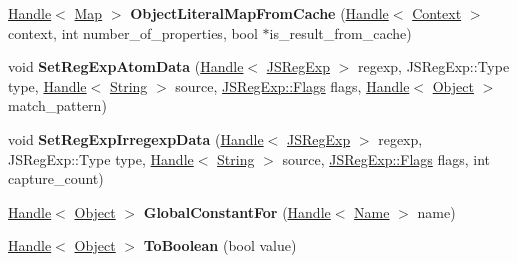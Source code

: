 \begin{DoxyCompactItemize}
\item 
\hyperlink{classv8_1_1internal_1_1_handle}{Handle}$<$ \hyperlink{classv8_1_1internal_1_1_map}{Map} $>$ {\bfseries Object\+Literal\+Map\+From\+Cache} (\hyperlink{classv8_1_1internal_1_1_handle}{Handle}$<$ \hyperlink{classv8_1_1internal_1_1_context}{Context} $>$ context, int number\+\_\+of\+\_\+properties, bool $\ast$is\+\_\+result\+\_\+from\+\_\+cache)\hypertarget{classv8_1_1internal_1_1_factory_ac680fa850230a4a608e92e330f265ba0}{}\label{classv8_1_1internal_1_1_factory_ac680fa850230a4a608e92e330f265ba0}

\item 
void {\bfseries Set\+Reg\+Exp\+Atom\+Data} (\hyperlink{classv8_1_1internal_1_1_handle}{Handle}$<$ \hyperlink{classv8_1_1internal_1_1_j_s_reg_exp}{J\+S\+Reg\+Exp} $>$ regexp, J\+S\+Reg\+Exp\+::\+Type type, \hyperlink{classv8_1_1internal_1_1_handle}{Handle}$<$ \hyperlink{classv8_1_1internal_1_1_string}{String} $>$ source, \hyperlink{classv8_1_1base_1_1_flags}{J\+S\+Reg\+Exp\+::\+Flags} flags, \hyperlink{classv8_1_1internal_1_1_handle}{Handle}$<$ \hyperlink{classv8_1_1internal_1_1_object}{Object} $>$ match\+\_\+pattern)\hypertarget{classv8_1_1internal_1_1_factory_aca744f4071916ff928536c07f8fa29f4}{}\label{classv8_1_1internal_1_1_factory_aca744f4071916ff928536c07f8fa29f4}

\item 
void {\bfseries Set\+Reg\+Exp\+Irregexp\+Data} (\hyperlink{classv8_1_1internal_1_1_handle}{Handle}$<$ \hyperlink{classv8_1_1internal_1_1_j_s_reg_exp}{J\+S\+Reg\+Exp} $>$ regexp, J\+S\+Reg\+Exp\+::\+Type type, \hyperlink{classv8_1_1internal_1_1_handle}{Handle}$<$ \hyperlink{classv8_1_1internal_1_1_string}{String} $>$ source, \hyperlink{classv8_1_1base_1_1_flags}{J\+S\+Reg\+Exp\+::\+Flags} flags, int capture\+\_\+count)\hypertarget{classv8_1_1internal_1_1_factory_aa3251014302022c9fe74eaee44af9190}{}\label{classv8_1_1internal_1_1_factory_aa3251014302022c9fe74eaee44af9190}

\item 
\hyperlink{classv8_1_1internal_1_1_handle}{Handle}$<$ \hyperlink{classv8_1_1internal_1_1_object}{Object} $>$ {\bfseries Global\+Constant\+For} (\hyperlink{classv8_1_1internal_1_1_handle}{Handle}$<$ \hyperlink{classv8_1_1internal_1_1_name}{Name} $>$ name)\hypertarget{classv8_1_1internal_1_1_factory_a05b0671d8d9d754fe28f68c610ab87dc}{}\label{classv8_1_1internal_1_1_factory_a05b0671d8d9d754fe28f68c610ab87dc}

\item 
\hyperlink{classv8_1_1internal_1_1_handle}{Handle}$<$ \hyperlink{classv8_1_1internal_1_1_object}{Object} $>$ {\bfseries To\+Boolean} (bool value)\hypertarget{classv8_1_1internal_1_1_factory_a26a495367429befbd0ca58866a62f403}{}\label{classv8_1_1internal_1_1_factory_a26a495367429befbd0ca58866a62f403}

\end{DoxyCompactItemize}

